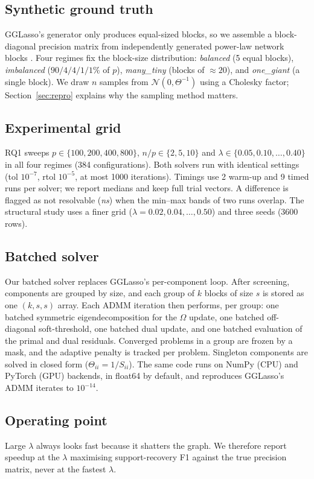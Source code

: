 \documentclass[conference]{IEEEtran}
\begin{document}
\subsection{Synthetic ground truth}
GGLasso's generator only produces equal-sized blocks, so we assemble a
block-diagonal precision matrix from independently generated power-law
network blocks \cite{gglasso2021}. Four regimes fix the block-size
distribution: \emph{balanced} (5 equal blocks), \emph{imbalanced}
($90/4/4/1/1\%$ of $p$), \emph{many\_tiny} (blocks of $\approx 20$), and
\emph{one\_giant} (a single block). We draw $n$ samples from
$\mathcal{N}(0,\Theta^{-1})$ using a Cholesky factor; Section~\ref{sec:repro}
explains why the sampling method matters.

\subsection{Experimental grid}
RQ1 sweeps $p\in\{100,200,400,800\}$, $n/p\in\{2,5,10\}$ and
$\lambda\in\{0.05,0.10,\dots,0.40\}$ in all four regimes (384
configurations). Both solvers run with identical settings
(tol $10^{-7}$, rtol $10^{-5}$, at most 1000 iterations). Timings use 2
warm-up and 9 timed runs per solver; we report medians and keep full trial
vectors. A difference is flagged as not resolvable (\emph{ns}) when the
min--max bands of two runs overlap. The structural study uses a finer grid
($\lambda=0.02,0.04,\dots,0.50$) and three seeds (3600 rows).

\subsection{Batched solver}
\label{sec:batched}
Our batched solver replaces GGLasso's per-component loop. After screening,
components are grouped by size, and each group of $k$ blocks of size $s$ is
stored as one $(k,s,s)$ array. Each ADMM iteration then performs, per group:
one batched symmetric eigendecomposition for the $\Omega$ update, one
batched off-diagonal soft-threshold, one batched dual update, and one batched
evaluation of the primal and dual residuals. Converged problems in a group
are frozen by a mask, and the adaptive penalty is tracked per problem.
Singleton components are solved in closed form ($\Theta_{ii}=1/S_{ii}$). The
same code runs on NumPy (CPU) and PyTorch (GPU) backends, in float64 by
default, and reproduces GGLasso's ADMM iterates to $10^{-14}$.

\subsection{Operating point}
Large $\lambda$ always looks fast because it shatters the graph. We
therefore report speedup at the $\lambda$ maximising support-recovery F1
against the true precision matrix, never at the fastest $\lambda$.
\end{document}
